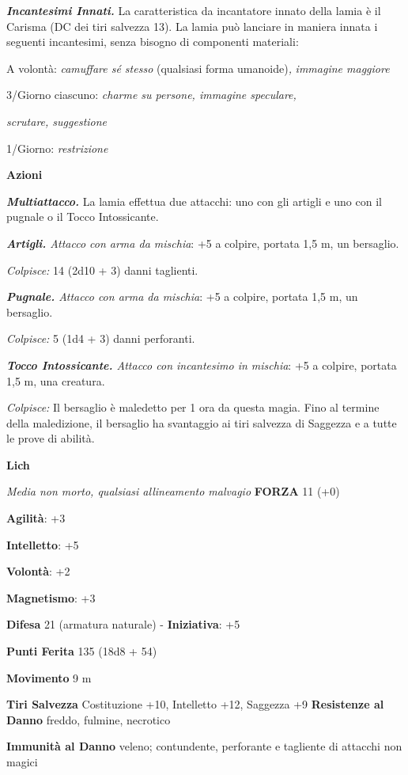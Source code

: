 \begin{multicols}{2}
\emph{\textbf{Incantesimi Innati.}} La caratteristica da incantatore
innato della lamia è il Carisma (DC dei tiri salvezza 13). La lamia può
lanciare in maniera innata i seguenti incantesimi, senza bisogno di
componenti materiali:

A volontà: \emph{camuffare sé stesso} (qualsiasi forma umanoide)\emph{,}
\emph{immagine maggiore}

3/Giorno ciascuno: \emph{charme su persone, immagine speculare,}

\emph{scrutare, suggestione}

1/Giorno: \emph{restrizione}

\textbf{Azioni}

\emph{\textbf{Multiattacco.}} La lamia effettua due attacchi: uno con
gli artigli e uno con il pugnale o il Tocco Intossicante.

\emph{\textbf{Artigli.} Attacco con arma da mischia}: +5 a colpire,
portata 1,5 m, un bersaglio.

\emph{Colpisce:} 14 (2d10 + 3) danni taglienti.

\emph{\textbf{Pugnale.} Attacco con arma da mischia}: +5 a colpire,
portata 1,5 m, un bersaglio.

\emph{Colpisce:} 5 (1d4 + 3) danni perforanti.

\emph{\textbf{Tocco Intossicante.} Attacco con incantesimo in mischia}:
+5 a colpire, portata 1,5 m, una creatura.

\emph{Colpisce:} Il bersaglio è maledetto per 1 ora da questa magia.
Fino al termine della maledizione, il bersaglio ha svantaggio ai tiri
salvezza di Saggezza e a tutte le prove di abilità.

\textbf{Lich}

\emph{Media non morto, qualsiasi allineamento malvagio} \textbf{FORZA}
11 (+0)

\textbf{Agilità}: +3

\textbf{Intelletto}: +5

\textbf{Volontà}: +2

\textbf{Magnetismo}: +3

\textbf{Difesa} 21 (armatura naturale) - \textbf{Iniziativa}: +5

\textbf{Punti Ferita} 135 (18d8 + 54)

\textbf{Movimento} 9 m

\textbf{Tiri Salvezza} Costituzione +10, Intelletto +12, Saggezza +9
\textbf{Resistenze al Danno} freddo, fulmine, necrotico

\textbf{Immunità al Danno} veleno; contundente, perforante e tagliente
di attacchi non magici


\end{multicols}
